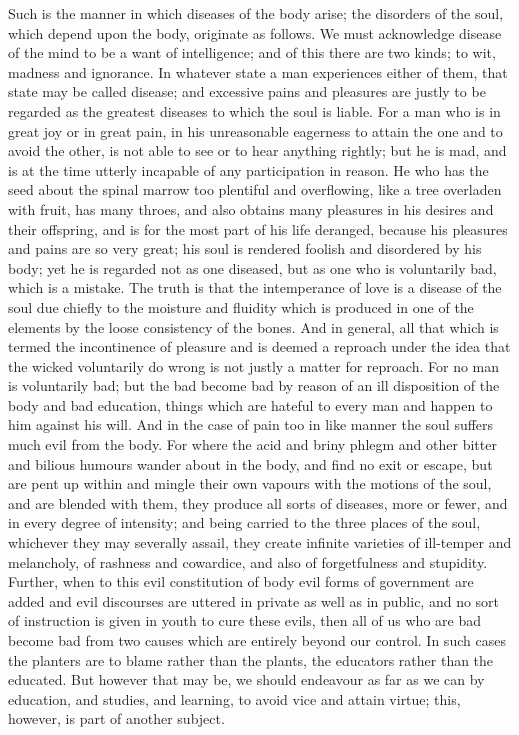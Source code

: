 \documentclass[11pt,letter]{article}
\begin{document}
\par  Such is the manner in which diseases of the body arise; the disorders of the soul, which depend upon the body, originate as follows. We must acknowledge disease of the mind to be a want of intelligence; and of this there are two kinds; to wit, madness and ignorance. In whatever state a man experiences either of them, that state may be called disease; and excessive pains and pleasures are justly to be regarded as the greatest diseases to which the soul is liable. For a man who is in great joy or in great pain, in his unreasonable eagerness to attain the one and to avoid the other, is not able to see or to hear anything rightly; but he is mad, and is at the time utterly incapable of any participation in reason. He who has the seed about the spinal marrow too plentiful and overflowing, like a tree overladen with fruit, has many throes, and also obtains many pleasures in his desires and their offspring, and is for the most part of his life deranged, because his pleasures and pains are so very great; his soul is rendered foolish and disordered by his body; yet he is regarded not as one diseased, but as one who is voluntarily bad, which is a mistake. The truth is that the intemperance of love is a disease of the soul due chiefly to the moisture and fluidity which is produced in one of the elements by the loose consistency of the bones. And in general, all that which is termed the incontinence of pleasure and is deemed a reproach under the idea that the wicked voluntarily do wrong is not justly a matter for reproach. For no man is voluntarily bad; but the bad become bad by reason of an ill disposition of the body and bad education, things which are hateful to every man and happen to him against his will. And in the case of pain too in like manner the soul suffers much evil from the body. For where the acid and briny phlegm and other bitter and bilious humours wander about in the body, and find no exit or escape, but are pent up within and mingle their own vapours with the motions of the soul, and are blended with them, they produce all sorts of diseases, more or fewer, and in every degree of intensity; and being carried to the three places of the soul, whichever they may severally assail, they create infinite varieties of ill-temper and melancholy, of rashness and cowardice, and also of forgetfulness and stupidity. Further, when to this evil constitution of body evil forms of government are added and evil discourses are uttered in private as well as in public, and no sort of instruction is given in youth to cure these evils, then all of us who are bad become bad from two causes which are entirely beyond our control. In such cases the planters are to blame rather than the plants, the educators rather than the educated. But however that may be, we should endeavour as far as we can by education, and studies, and learning, to avoid vice and attain virtue; this, however, is part of another subject.
\end{document}
